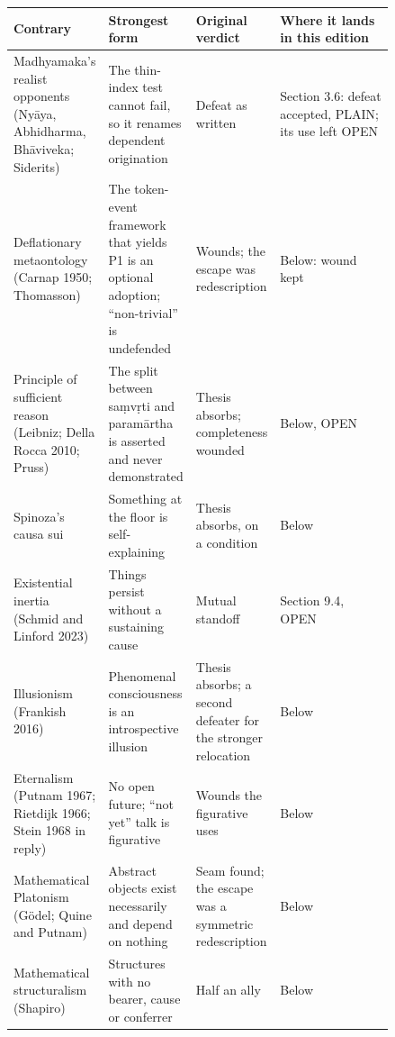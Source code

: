 \documentclass[11pt]{article}
\begin{document}
{\small\begin{longtable}{>{\raggedright\arraybackslash}p{0.119\linewidth}>{\raggedright\arraybackslash}p{0.174\linewidth}>{\raggedright\arraybackslash}p{0.196\linewidth}>{\raggedright\arraybackslash}p{0.350\linewidth}}
\toprule
\textbf{Contrary} & \textbf{Strongest form} & \textbf{Original verdict} & \textbf{Where it lands in this edition} \\ \midrule\endhead
Madhyamaka's realist opponents (Nyāya, Abhidharma, Bhāviveka; Siderits) & The thin-index test cannot fail, so it renames dependent origination & Defeat as written & Section 3.6: defeat accepted, PLAIN; its use left OPEN \\
Deflationary metaontology (Carnap 1950; Thomasson) & The token-event framework that yields P1 is an optional adoption; ``non-trivial'' is undefended & Wounds; the escape was redescription & Below: wound kept \\
Principle of sufficient reason (Leibniz; Della Rocca 2010; Pruss) & The split between saṃvṛti and paramārtha is asserted and never demonstrated & Thesis absorbs; completeness wounded & Below, OPEN \\
Spinoza's causa sui & Something at the floor is self-explaining & Thesis absorbs, on a condition & Below \\
Existential inertia (Schmid and Linford 2023) & Things persist without a sustaining cause & Mutual standoff & Section 9.4, OPEN \\
Illusionism (Frankish 2016) & Phenomenal consciousness is an introspective illusion & Thesis absorbs; a second defeater for the stronger relocation & Below \\
Eternalism (Putnam 1967; Rietdijk 1966; Stein 1968 in reply) & No open future; ``not yet'' talk is figurative & Wounds the figurative uses & Below \\
Mathematical Platonism (Gödel; Quine and Putnam) & Abstract objects exist necessarily and depend on nothing & Seam found; the escape was a symmetric redescription & Below \\
Mathematical structuralism (Shapiro) & Structures with no bearer, cause or conferrer & Half an ally & Below \\
\bottomrule\end{longtable}}
\end{document}
